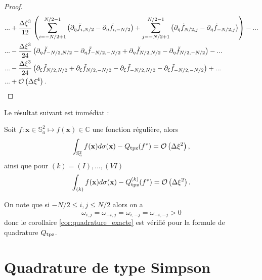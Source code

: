 \begin{proof}
\begin{align*}
& ... + \dfrac{\Delta \xi^3}{12} \left( \displaystyle\sum\limits_{i=-N/2+1}^{N/2-1} \left( \partial_{\eta}\tilde{f}_{i, N/2} - \partial_{\eta}\tilde{f}_{i, -N/2} \right) + \displaystyle\sum\limits_{j=-N/2+1}^{N/2-1} \left( \partial_{\eta}\tilde{f}_{N/2,j} - \partial_{\eta}\tilde{f}_{-N/2,j} \right) \right) - ...  \\
	&  ... - \dfrac{\Delta \xi^3}{24} \left( \partial_{\eta}\tilde{f}_{-N/2,N/2} - \partial_{\eta}\tilde{f}_{-N/2,-N/2} + \partial_{\eta}\tilde{f}_{N/2,N/2}  - \partial_{\eta}\tilde{f}_{N/2,-N/2} \right) - ...  \\
& ... - \dfrac{\Delta \xi^3}{24} \left( \partial_{\xi}\tilde{f}_{N/2,N/2} + \partial_{\xi}\tilde{f}_{N/2,-N/2} - \partial_{\xi}\tilde{f}_{-N/2,N/2}  - \partial_{\xi}\tilde{f}_{-N/2,-N/2} \right)+...\\
& ... + \mathcal{O} \left( \Delta \xi^4 \right).
\end{align*}
\end{proof}

Le résultat suivant est immédiat :
\begin{corollaire}
Soit $f : \mathbf{x} \in \mathbb{S}_a^2 \mapsto f(\mathbf{x}) \in \mathbb{C}$ une fonction régulière, alors
\begin{equation}
\displaystyle\int_{\mathbb{S}_a^2} f(\mathbf{x}) d\sigma(\mathbf{x}) - Q_{\text{tpz}}(f^*) = \mathcal{O} \left( \Delta \xi^2 \right),
\end{equation}
ainsi que pour $(k) = (I), ..., (VI)$
\begin{equation}
\displaystyle\int_{(k)} f(\mathbf{x}) d\sigma(\mathbf{x}) - Q_{\text{tpz}}^{(k)}(f^*) = \mathcal{O} \left( \Delta \xi^2 \right).
\end{equation}
\end{corollaire}

\begin{remarque}
On note que si $-N/2 \leq i,j \leq N/2$ alors on a 
\begin{equation}
\omega_{i,j} = \omega_{-i,j} = \omega_{i,-j} = \omega_{-i,-j} > 0
\end{equation}
donc le corollaire \ref{cor:quadrature_exacte} est vérifié pour la formule de quadrature $Q_{\text{tpz}}$.
\end{remarque}











\section{Quadrature de type Simpson}

